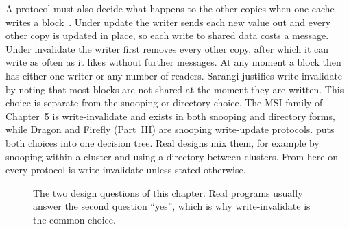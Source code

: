 A protocol must also decide what happens to the other copies when one cache writes
a block~\cite[\S12.4.6]{sarangi2025basic}. Under \gls{update}
the writer sends each new value out and every other copy is updated in place, so
each write to shared data costs a message. Under
\gls{invalidate} the writer first removes every other
copy, after which it can write as often as it likes without further messages. At
any moment a block then has either one writer or any number of readers. Sarangi
justifies write-invalidate by noting that most blocks are not shared at the moment
they are written. This choice is separate from the snooping-or-directory choice.
The MSI family of Chapter~5 is write-invalidate and exists in both snooping and
directory forms, while Dragon and Firefly (Part~III) are snooping write-update
protocols.  puts both choices into one decision tree. Real
designs mix them, for example by snooping within a cluster and using a directory
between clusters. From here on every protocol is write-invalidate unless stated
otherwise.

\begin{figure}[htbp]
\centering
{}
\caption[Decision tree: choosing a coherence organisation]{The two design
questions of this chapter. Real programs usually answer the second question
``yes'', which is why write-invalidate is the common choice.}
\label{fig:choose-tree}
\end{figure}
